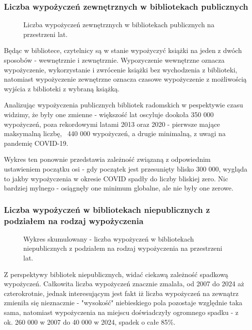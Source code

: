 \documentclass[12pt]{article}
\begin{document}
\subsubsection{Liczba wypożyczeń zewnętrznych w bibliotekach publicznych}
\begin{figure}[H]
    
    \caption{Liczba wypożyczeń zewnętrznych w bibliotekach publicznych na przestrzeni lat.}
\end{figure}

Będąc w bibliotece, czytelnicy są w stanie wypożyczyć książki na jeden z dwóch sposobów - wewnętrznie i zewnętrznie. Wypozyczenie wewnętrzne oznacza wypożyczenie, 
wykorzystanie i zwrócenie książki bez wychodzenia z biblioteki, natomiast wypożyczenie zewnętrzne oznacza czasowe wypożyczenie z możliwością wyjścia z biblioteki 
z wybraną książką. 

Analizując wypożyczenia publicznych bibliotek radomskich w pespektywie czasu widzimy, że były one zmienne - większość lat oscyluje dookoła 350 000 wypożyczeń, 
poza rekordowymi latami 2013 oraz 2020 - pierwsze mające maksymalną liczbę, ~440 000 wypożyczeń, a drugie minimalną, z uwagi na pandemię COVID-19. 

Wykres ten ponownie przedstawia zależność związaną z odpowiednim ustawieniem początku osi - gdy początek jest przesunięty blisko 300 000, wygląda to jakby 
wypożyczenia w okresie COVID spadły do liczby bliskiej zero. Nic bardziej mylnego - osiągnęły one minimum globalne, ale nie były one zerowe. 


\subsubsection{Liczba wypożyczeń w bibliotekach niepublicznych z podziałem na rodzaj wypożyczenia}
\begin{figure}[H]
    
    \caption{Wykres skumulowany - liczba wypożyczeń w bibliotekach niepublicznych z podziałem na rodzaj wypożyczenia
    na przestrzeni lat.}
\end{figure}

Z perspektywy bibliotek niepublicznych, widać ciekawą zależność spadkową wypożyczeń. Całkowita liczba wypożyczeń znacznie zmalała, od 2007 do 2024 aż czterokrotnie, 
jednak interesującym jest fakt iż liczba wypożyczeń na zewnątrz zmieniła się nieznacznie - "wysokość" niebieskiego pola pozostaje względnie taka sama, 
natomiast wypożyczenia na miejscu doświadczyły ogromnego spadku - z ok. 260 000 w 2007 do 40 000 w 2024, spadek o całe 85\%.  
\end{document}
